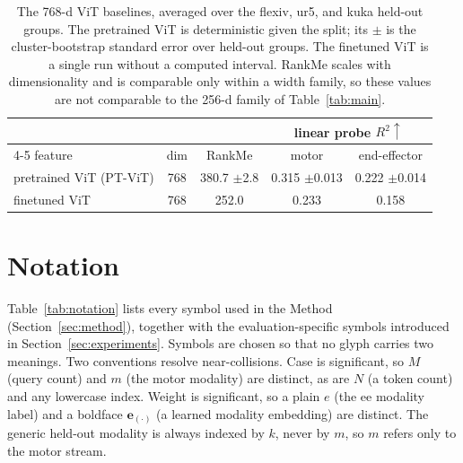 \documentclass{article}
\begin{document}
\begin{table}[!htbp]
  \centering
  \small
  \caption{The 768-d ViT baselines, averaged over the flexiv, ur5, and kuka
  held-out groups. The pretrained ViT is deterministic given the split; its $\pm$ is the cluster-bootstrap standard error over held-out groups. The finetuned ViT is a single run without a computed interval. RankMe scales with dimensionality and is comparable only within a width family, so these values are not comparable to the 256-d family of Table~\ref{tab:main}.}
  \label{tab:vitbase}
  \begin{tabular}{lcccc}
    \toprule
    & & & \multicolumn{2}{c}{linear probe $R^2\uparrow$} \\
    \cmidrule(lr){4-5}
    feature & dim & RankMe & motor & end-effector \\
    \midrule
    pretrained ViT (PT-ViT)   & 768 & 380.7 $\pm$2.8 & 0.315 $\pm$0.013 & 0.222 $\pm$0.014 \\
    finetuned ViT             & 768 & 252.0 & 0.233 & 0.158 \\
    \bottomrule
  \end{tabular}
\end{table}

\clearpage

\section{Notation}
\label{sec:notation}
Table~\ref{tab:notation} lists every symbol used in the Method (Section~\ref{sec:method}), together with the evaluation-specific symbols introduced in Section~\ref{sec:experiments}. Symbols are chosen so that no glyph carries two meanings. Two conventions resolve near-collisions. Case is significant, so $M$ (query count) and $m$ (the motor modality) are distinct, as are $N$ (a token count) and any lowercase index. Weight is significant, so a plain $e$ (the ee modality label) and a boldface $\mathbf{e}_{(\cdot)}$ (a learned modality embedding) are distinct. The generic held-out modality is always indexed by $k$, never by $m$, so $m$ refers only to the motor stream.
\end{document}
